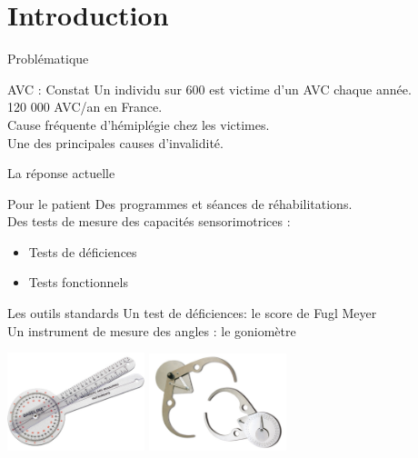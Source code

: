 \section{Introduction}


\begin{frame}{Problématique}
	\begin{alertblock}{AVC : Constat}
		Un individu sur 600 est victime d'un AVC chaque année. \\
		120 000 AVC/an en France. \\ \pause 
		Cause fréquente d'hémiplégie chez les victimes. \\
		Une des principales causes d'invalidité.
	\end{alertblock}
\end{frame}

\begin{frame}{La réponse actuelle}
	\begin{block}{Pour le patient}
	Des programmes et séances de réhabilitations.\\
	Des tests de mesure des capacités sensorimotrices :
		\begin{itemize}
			\item Tests de déficiences
			\item Tests fonctionnels
		\end{itemize}
	\end{block}
\end{frame}

\begin{frame}
	\begin{block}{Les outils standards}
		Un test de déficiences: le score de Fugl Meyer \\
		Un instrument de mesure des angles : le goniomètre
		\end{block}
		\begin{center}
			\includegraphics[width=4cm]{../images/goniometre.jpg}
			\includegraphics[width=4cm]{../images/clockprop.jpg}
	\end{center}
\end{frame}

